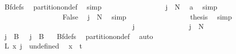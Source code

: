 \begin{isabellebody}
\ Bf{\isacharunderscore}{\kern0pt}defs\ \isamarkupfalse%
\ partition{\isacharunderscore}{\kern0pt}on{\isacharunderscore}{\kern0pt}def\ \isamarkupfalse%
\ simp\isanewline
\ \ \ \ \ \ \ \ \ \ \ \ \ \ \isamarkupfalse%
\ \isamarkupfalse%
\ {\isachardoublequoteopen}{\isasymnot}{\isacharparenleft}{\kern0pt}j\ {\isasymin}\ {\isacharbraceleft}{\kern0pt}{\isachardot}{\kern0pt}{\isachardot}{\kern0pt}{\isacharless}{\kern0pt}N{\isacharprime}{\kern0pt}{\isacharbraceright}{\kern0pt}{\isacharparenright}{\kern0pt}{\isachardoublequoteclose}\ \isamarkupfalse%
\ a\ \isamarkupfalse%
\ simp\isanewline
\ \ \ \ \ \ \ \ \ \ \ \ \ \ \isamarkupfalse%
\ \isamarkupfalse%
\ False\ \isamarkupfalse%
\ {\isacartoucheopen}j\ {\isasymin}\ {\isacharbraceleft}{\kern0pt}{\isachardot}{\kern0pt}{\isachardot}{\kern0pt}{\isacharless}{\kern0pt}N{\isacharprime}{\kern0pt}{\isacharbraceright}{\kern0pt}{\isacartoucheclose}\ \isamarkupfalse%
\ simp\isanewline
\ \ \ \ \ \ \ \ \ \ \ \ \ \ \isamarkupfalse%
\ \isamarkupfalse%
\ {\isacharquery}{\kern0pt}thesis\ \isamarkupfalse%
\ simp\isanewline
\ \ \ \ \ \ \ \ \ \ \ \ \isamarkupfalse%
\isanewline
\ \ \ \ \ \ \ \ \ \ \isamarkupfalse%
\isanewline
\ \ \ \ \ \ \ \ \ \ \ \ \isamarkupfalse%
\ j\ \isanewline
\ \ \ \ \ \ \ \ \ \ \ \ \isamarkupfalse%
\ {\isachardoublequoteopen}j\ {\isasymnotin}\ {\isacharbraceleft}{\kern0pt}{\isachardot}{\kern0pt}{\isachardot}{\kern0pt}{\isacharless}{\kern0pt}N{\isacharprime}{\kern0pt}{\isacharbraceright}{\kern0pt}{\isachardoublequoteclose}\isanewline
\ \ \ \ \ \ \ \ \ \ \ \ \isamarkupfalse%
\ \isamarkupfalse%
\ {\isachardoublequoteopen}j\ {\isasymnotin}\ {\isacharparenleft}{\kern0pt}B\ {}{\isacharparenright}{\kern0pt}\ {\isasymand}\ j\ {\isasymnotin}\ B\ {}{\isachardoublequoteclose}\ \isamarkupfalse%
\ Bf{\isacharunderscore}{\kern0pt}defs\ \isamarkupfalse%
\ partition{\isacharunderscore}{\kern0pt}on{\isacharunderscore}{\kern0pt}def\ \isamarkupfalse%
\ auto\isanewline
\ \ \ \ \ \ \ \ \ \ \ \ \isamarkupfalse%
\ \isamarkupfalse%
\ {\isachardoublequoteopen}L{\isacharprime}{\kern0pt}\ x\ j\ {\isacharequal}{\kern0pt}\ undefined{\isachardoublequoteclose}\ \isamarkupfalse%
\ {\isacartoucheopen}x\ {\isacharequal}{\kern0pt}\ t{\isacartoucheclose}\ \isamarkupfalse%

\end{isabellebody}
